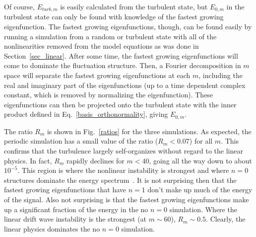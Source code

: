 \documentclass[showpacs,preprintnumbers,amsmath,amssymb,superscriptaddress,aip]{revtex4-1}
\begin{document}
Of course, $E_{turb,m}$ is easily calculated from the turbulent state, but $E_{0,m}$ in the 
turbulent state can only be found with knowledge of the fastest growing eigenfunction. The fastest growing eigenfunctions, though, can be found easily by running a simulation from a random 
or turbulent state with all of the nonlinearities removed from the model equations as was done in Section~\ref{sec_linear}. After some time, the fastest growing eigenfunctions will come to
dominate the fluctuation structure. Then, a Fourier decomposition in $m$ space will separate the fastest growing eigenfunctions at each $m$, including the real and imaginary part
of the eigenfunctions (up to a time dependent complex constant, which is removed by normalizing the eigenfunction). These eigenfunctions can then be projected onto the turbulent state
with the inner product defined in Eq.~\ref{basis_orthonormality}, giving $E_{0,m}$.

The ratio $R_m$ is shown in Fig.~\ref{ratios} for the three simulations. As expected, the periodic simulation has a small value of the ratio ($R_m < 0.07$) for all $m$. 
This confirms that the turbulence largely self-organizes
without regard to the linear physics. In fact, $R_m$ rapidly declines for $m<40$, going all the way down to about $10^{-5}$. This region is where the nonlinear instability is strongest and where
$n=0$ structures dominate the energy spectrum~\cite{friedman2012}. It is not surprising then that the fastest growing eigenfunctions that have $n=1$ don't make up much of the energy of the signal.
Also not surprising is that the fastest growing eigenfunctions make up a significant fraction of the energy in the no $n=0$ simulation. Where the linear drift wave instability is the strongest
(at $m \sim 60$), $R_m \sim 0.5$. Clearly, the linear physics dominates the no $n=0$ simulation.
\end{document}

